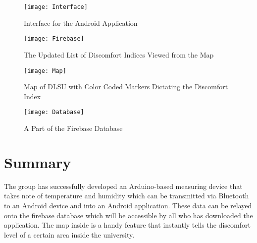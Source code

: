 \begin{figure}[h]
\centering
\texttt{[image: Interface]}
\caption{Interface for the Android Application}
\end{figure}

\begin{figure}[h]
\centering
\texttt{[image: Firebase]}
\caption{The Updated List of Discomfort Indices Viewed from the Map}
\end{figure}

\begin{figure}[h]
\centering
\texttt{[image: Map]}
\caption{Map of DLSU with Color Coded Markers Dictating the Discomfort Index}
\end{figure}

\begin{figure}[h]
\centering
\texttt{[image: Database]}
\caption{A Part of the Firebase Database}
\end{figure}

\section{Summary}
The group has successfully developed an Arduino-based measuring device that takes note of temperature and humidity which can be transmitted via Bluetooth to an Android device and into an Android application. These data can be relayed onto the firebase database which will be accessible by all who has downloaded the application. The map inside is a handy feature that instantly tells the discomfort level of a certain area inside the university.